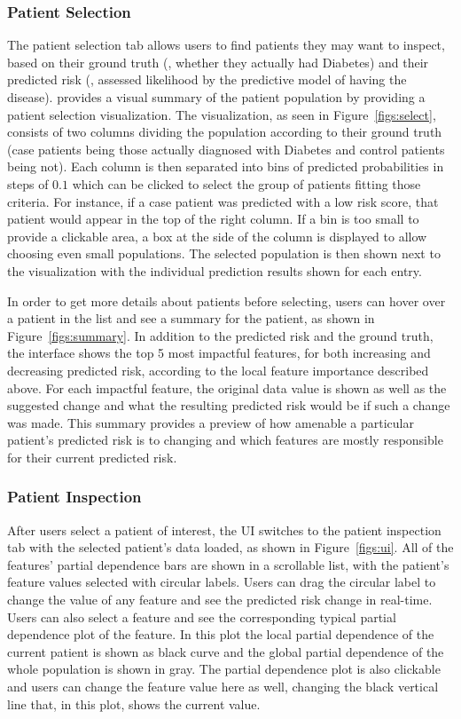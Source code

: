 \subsubsection{Patient Selection}

The patient selection tab allows users to find patients they may want to inspect, based on their ground truth (\eg, whether they actually had Diabetes) and their predicted risk (\eg, assessed likelihood by the predictive model of having the disease).  \prospector provides a visual summary of the patient population by providing a patient selection visualization. The visualization, as seen in Figure~\ref{figs:select}, consists of two columns dividing the population according to their ground truth
(case patients being those actually diagnosed with Diabetes and control patients being not).
Each column is then separated into bins of predicted probabilities in steps of $0.1$
which can be clicked to select the group of patients fitting those criteria.  For instance, if a case patient was predicted with a low risk score, that patient would appear in the top of the right column.  If a bin is too small to provide a clickable area, a box at the side of the column is displayed to allow choosing even small populations.  The selected population is then shown next to the visualization with the individual prediction results shown for each entry.

In order to get more details about patients before selecting, users can hover over a patient in the list and see a summary for the patient, as shown in Figure~\ref{figs:summary}.
In addition to the predicted risk and the ground truth, the interface shows the top 5 most impactful features, for both increasing and decreasing predicted risk, according to the local feature importance described above.  For each impactful feature, the original data value is shown as well as the suggested change and what the resulting predicted risk would be if such a change was made.  This summary provides a preview of how amenable a particular patient's predicted risk is to changing and which features are mostly responsible for their current predicted risk.

\subsubsection{Patient Inspection}

After users select a patient of interest, the UI switches to the
patient inspection tab with the selected patient's data loaded, as shown in Figure~\ref{figs:ui}.
All of the features' partial dependence bars are shown in a scrollable list, with the patient's feature values selected with circular labels.
Users can drag the circular label to change the value of any feature and see the predicted risk change in real-time.
Users can also select a feature and see the corresponding typical partial dependence plot of the feature.
In this plot the local partial dependence of the current patient is shown as
black curve and the global partial dependence of the whole population is shown
in gray. The partial dependence plot is also clickable and users can change the feature value here as well, changing the black vertical line that, in this plot, shows the current value.  

